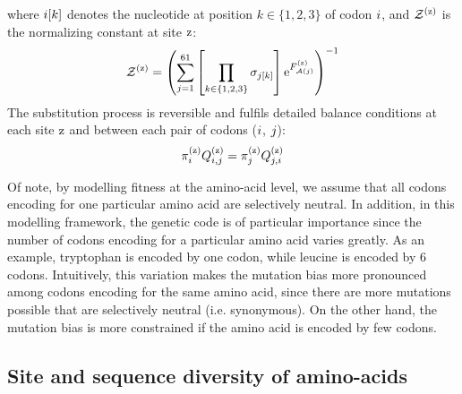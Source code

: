 where ${i}[k]$ denotes the nucleotide at position $k \in \{ 1, 2, 3 \}$ of \gls{codon} ${i}$, and $\mathcal{Z}^{(\text{z})} $ is the normalizing constant at site $\text{z}$:
\begin{align}
    \mathcal{Z}^{(\text{z})} = \left( \sum\limits_{{j}=1}^{61} \left[\prod\limits_{k \in \{ 1, 2, 3 \}} \sigma_{{j}[k]}\right] \text{e}^{F_{\mathcal{A}({j})}^{(\text{z})}} \right)^{-1}
\end{align}
The \gls{substitution} process is reversible and fulfils detailed balance conditions at each site $\text{z}$ and between each pair of \glspl{codon} (${i}$, ${j}$):
\begin{align}
    \pi_{{i}}^{(\text{z})} Q_{{i}, {j}}^{(\text{z})} = \pi_{{j}}^{(\text{z})} Q_{{j}, {i}}^{(\text{z})}
    \label{codonSubBalance}
\end{align}

Of note, by modelling fitness at the amino-acid level, we assume that all \glspl{codon} encoding for one particular amino acid are selectively \gls{neutral}.
In addition, in this modelling framework, the genetic code is of particular importance since the number of \glspl{codon} encoding for a particular amino acid varies greatly.
As an example, tryptophan is encoded by one \gls{codon}, while leucine is encoded by 6 \glspl{codon}.
Intuitively, this variation makes the mutation bias more pronounced among \glspl{codon} encoding for the same amino acid, since there are more mutations possible that are selectively \gls{neutral} (i.e. synonymous).
On the other hand, the mutation bias is more constrained if the amino acid is encoded by few \glspl{codon}.

\subsection{Site and sequence diversity of amino-acids}
\label{subsec:entropy}

